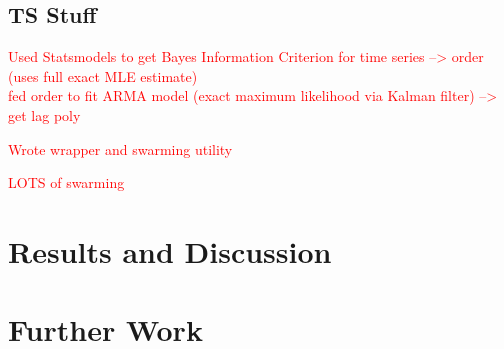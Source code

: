 \documentclass[oneside,12pt,openany]{book}
\newcommand\blankpage{
	\vfill
	\pagebreak
	\ifthispageodd{\null
		\vfill
		\vfill
		\clearpage}{}
}
\begin{document}
	\section{TS Stuff}
	
	\textcolor{red}{Used Statsmodels to get Bayes Information Criterion for time series --> order (uses full exact MLE estimate) \\ fed order to fit ARMA model (exact maximum likelihood via Kalman filter) --> get lag poly }

	
	\textcolor{red}{Wrote wrapper and swarming utility}
	
	\textcolor{red}{LOTS of swarming}
	
	\chapter{Results and Discussion}
	
	\chapter{Further Work}
	
	
	
	\blankpage
	\nocite{*}  %
	{}
	
	\appendices
	
\end{document}
